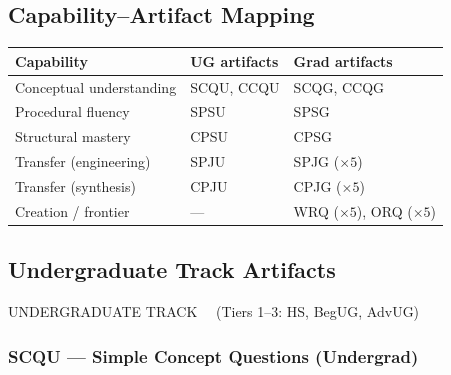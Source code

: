 \documentclass[11pt,a4paper]{article}
\begin{document}
\subsection{Capability--Artifact Mapping}

\begin{center}
\begin{tabularx}{\textwidth}{lXX}
\toprule
\textbf{Capability} & \textbf{UG artifacts} & \textbf{Grad artifacts}\\
\midrule
Conceptual understanding & SCQU, CCQU & SCQG, CCQG\\
Procedural fluency       & SPSU       & SPSG\\
Structural mastery       & CPSU       & CPSG\\
Transfer (engineering)   & SPJU       & SPJG ($\times 5$)\\
Transfer (synthesis)     & CPJU       & CPJG ($\times 5$)\\
Creation / frontier      & ---        & WRQ ($\times 5$), ORQ ($\times 5$)\\
\bottomrule
\end{tabularx}
\end{center}

\newpage
\subsection{Undergraduate Track Artifacts}
\label{sec:ug-artifacts}

\begin{tcolorbox}[trackheaderUG]
UNDERGRADUATE TRACK \ \ (Tiers 1--3: HS, BegUG, AdvUG)
\end{tcolorbox}

\bigskip

\subsubsection{SCQU --- Simple Concept Questions (Undergrad)}
\end{document}
